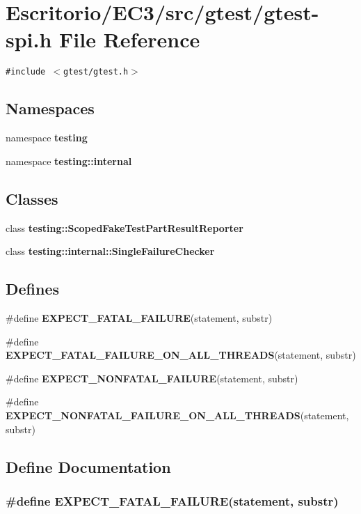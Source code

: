 \section{Escritorio/EC3/src/gtest/gtest-spi.h File Reference}
\label{gtest-spi_8h}
{\tt \#include $<$gtest/gtest.h$>$}\par
\subsection*{Namespaces}
\begin{CompactItemize}
\item 
namespace {\bf testing}
\item 
namespace {\bf testing::internal}
\end{CompactItemize}
\subsection*{Classes}
\begin{CompactItemize}
\item 
class {\bf testing::ScopedFakeTestPartResultReporter}
\item 
class {\bf testing::internal::SingleFailureChecker}
\end{CompactItemize}
\subsection*{Defines}
\begin{CompactItemize}
\item 
\#define {\bf EXPECT\_\-FATAL\_\-FAILURE}(statement, substr)
\item 
\#define {\bf EXPECT\_\-FATAL\_\-FAILURE\_\-ON\_\-ALL\_\-THREADS}(statement, substr)
\item 
\#define {\bf EXPECT\_\-NONFATAL\_\-FAILURE}(statement, substr)
\item 
\#define {\bf EXPECT\_\-NONFATAL\_\-FAILURE\_\-ON\_\-ALL\_\-THREADS}(statement, substr)
\end{CompactItemize}


\subsection{Define Documentation}
\subsubsection{\setlength{\rightskip}{0pt plus 5cm}\#define EXPECT\_\-FATAL\_\-FAILURE(statement, substr)}\label{gtest-spi_8h_076fe901e36c95b0a001e265ee9abc83}


